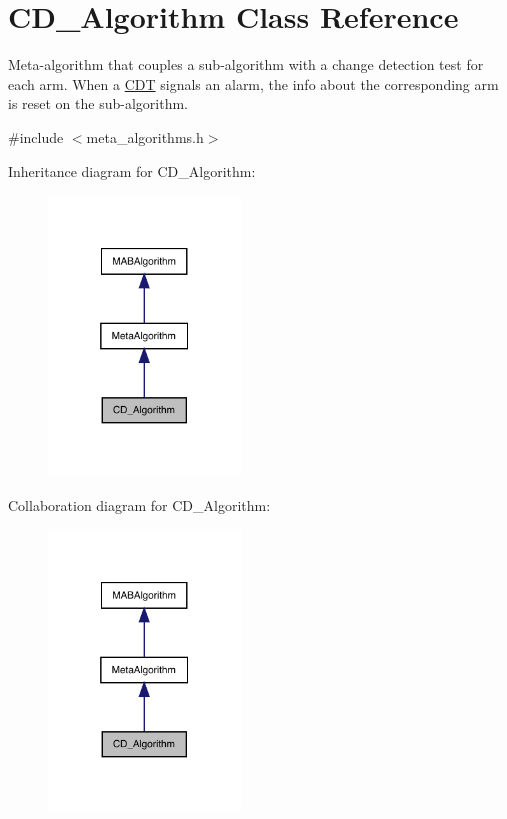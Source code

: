 \hypertarget{class_c_d___algorithm}{}\section{C\+D\+\_\+\+Algorithm Class Reference}
\label{class_c_d___algorithm}


Meta-\/algorithm that couples a sub-\/algorithm with a change detection test for each arm. When a \mbox{\hyperlink{class_c_d_t}{C\+DT}} signals an alarm, the info about the corresponding arm is reset on the sub-\/algorithm.  




{\ttfamily \#include $<$meta\+\_\+algorithms.\+h$>$}



Inheritance diagram for C\+D\+\_\+\+Algorithm\+:
\nopagebreak
\begin{figure}[H]
\begin{center}
\leavevmode
\includegraphics[width=145pt]{class_c_d___algorithm__inherit__graph}
\end{center}
\end{figure}


Collaboration diagram for C\+D\+\_\+\+Algorithm\+:
\nopagebreak
\begin{figure}[H]
\begin{center}
\leavevmode
\includegraphics[width=145pt]{class_c_d___algorithm__coll__graph}
\end{center}
\end{figure}
